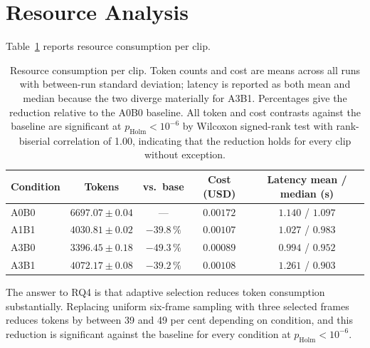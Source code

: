 \section{Resource Analysis}
\label{sec:cost}

Table~\ref{tab:cost} reports resource consumption per clip.

\begin{table}[htbp]
\centering
\caption{Resource consumption per clip. Token counts and cost are means
across all runs with between-run standard deviation; latency is reported
as both mean and median because the two diverge materially for A3B1.
Percentages give the reduction relative to the A0B0 baseline. All token
and cost contrasts against the baseline are significant at
$p_{\text{Holm}} < 10^{-6}$ by Wilcoxon signed-rank test with
rank-biserial correlation of 1.00, indicating that the reduction holds for
every clip without exception.}
\label{tab:cost}
\small
\begin{tabular}{@{}lcccc@{}}
\toprule
Condition & Tokens & vs.\ base & Cost (USD) & Latency mean / median (s) \\
\midrule
A0B0 & $6697.07 \pm 0.04$ & ---         & $0.00172$ & $1.140$ / $1.097$ \\
A1B1 & $4030.81 \pm 0.02$ & $-39.8\,\%$ & $0.00107$ & $1.027$ / $0.983$ \\
A3B0 & $3396.45 \pm 0.18$ & $-49.3\,\%$ & $0.00089$ & $0.994$ / $0.952$ \\
A3B1 & $4072.17 \pm 0.08$ & $-39.2\,\%$ & $0.00108$ & $1.261$ / $0.903$ \\
\bottomrule
\end{tabular}
\end{table}

The answer to RQ4 is that adaptive selection reduces token consumption
substantially. Replacing uniform six-frame sampling with three selected
frames reduces tokens by between 39 and 49 per cent depending on
condition, and this reduction is significant against the baseline for
every condition at $p_{\text{Holm}} < 10^{-6}$.

